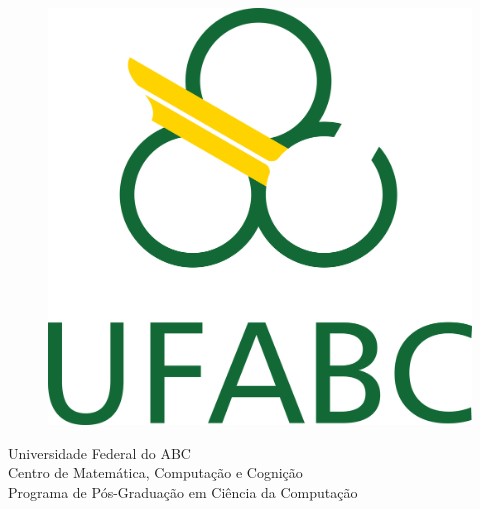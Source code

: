   \begin{capa}%
    \begin{figure}[h!]%
        \centering%
        \includegraphics[scale=1.2]{figs/logo.png}%
      \end{figure}%
    \center
	\ABNTEXchapterfont\large{Universidade Federal do ABC \\ Centro de Matemática, Computação e Cognição  \\ Programa de Pós-Graduação em Ciência da Computação}

    \vfill
    \ABNTEXchapterfont\bfseries\LARGE\imprimirtitulo
    \vfill

	\ABNTEXchapterfont\large\imprimirautor
	\vfill
%
	
    \large\imprimirlocal
    
    \large\imprimirdata

    \vspace*{1cm}
  \end{capa}
